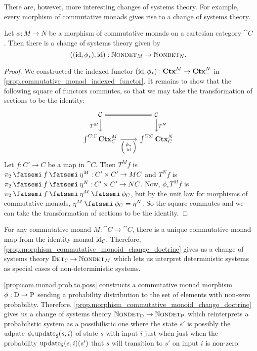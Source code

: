 \documentclass[DynamicalBook]{subfiles}
\begin{document}
There are, however, more interesting changes of systems theory. For example, every
morphism of commutative monads gives rise to a change of systems theory.

\begin{proposition}\label{prop.morphism_commutative_monoid_change_doctrine}
  Let $\phi : M \to N$ be a morphism of commutative monads on a cartesian
  category $\cat{C}$. Then there is a change of systems theory given by
  \[
((\mathrm{id}, \phi_{\ast}), \mathrm{id}) : \mathbb{N}\textsc{ondet}_{M} \to \mathbb{N}\textsc{ondet}_{N}.
  \]
\end{proposition}
\begin{proof}
We constructed the indexed functor $(\mathrm{id}, \phi_{\ast}) : \textbf{Ctx}_{-}^M \to
\textbf{Ctx}_{-}^N$ in \cref{prop.commutative_monad_indexed_functor}. It remains to
show that the following square of functors commutes, so that we may take the
transformation of sections to be the identity:
\[
  \begin{tikzcd}
\cat{C} \ar[r, equals]\ar[d,"T^M"'] & \cat{C}  \ar[d,"T^N"]\\
  \int^{C : \cat{C}}\smctx{C}^M \ar[r, "{\littlelens{\phi_{\ast}}{\id}}"']  & \int^{C : \cat{C}}
  \smctx{C}^N  
  \end{tikzcd}
\]
Let $f : C' \to C$ be a map in $\cat{C}$. Then $T^Mf$ is $\pi_2 \then f \then \eta^M
: C' \times C' \to MC$ and $T^N f$ is $\pi_2 \then f \then \eta^N
: C' \times C' \to NC$. Now, $\phi_{\ast}T^M f$ is $\pi_2 \then f \then \eta^M
\then \phi_C$, but by the unit law for morphisms of commutative monads, $\eta^M
\then \phi_C = \eta^N$. So the square commutes and we can take the
transformation of sections to be the identity.
\end{proof}
  
\begin{example}\label{ex:commutative.monad.change.doctrine.det}
  For any commutative monad $M : \cat{C} \to \cat{C}$, there is a unique commutative monad map from
  the identity monad $\mathrm{id}_{\mathcal{C}}$. Therefore,
  \cref{prop.morphism_commutative_monoid_change_doctrine} gives us a change of
  systems theory $\mathbb{D}\textsc{et}_{\mathcal{C}} \to \mathbb{N}\textsc{ondet}_{M}$ which lets us interpret
  deterministic systems as special cases of non-deterministic systems.
\end{example}

\begin{example}\label{ex:commutative.monad.change.doctrine.prob.to.poss}
\cref{prop:com.monad.prob.to.poss} constructs a commutative monad morphism $\phi
: \mathrm{D} \to \mathrm{P}$ sending a probability distribution to the set of
elements with non-zero probability. Therefore,
\cref{prop.morphism_commutative_monoid_change_doctrine} gives us a change of
systems theory $\mathbb{N}\textsc{ondet}_{\mathrm{D}} \to \mathbb{N}\textsc{ondet}_{\mathrm{P}}$ which reinterprets a
probabilistic system as a possibilistic one where the state $s'$ is possibly the
udpate $\phi_{\ast}\mathrm{update}_{\mathsf{S}}(s, i)$ of state $s$ with input $i$ just when just
when the probability $\mathrm{update}_{\mathsf{S}}(s, i)(s')$ that $s$ will transition to $s'$ on
input $i$ is non-zero.
\end{example}
\end{document}
